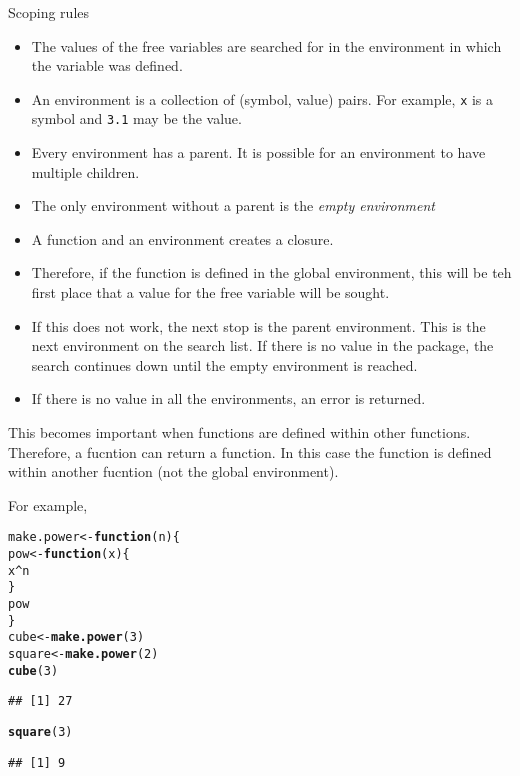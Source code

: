 \documentclass[12pt, a4paper, oneside]{article}\usepackage[]{graphicx}\usepackage[]{color}
\makeatletter
\newcommand{\hlnum}[1]{\textcolor[rgb]{0.686,0.059,0.569}{#1}}%
\newcommand{\hlopt}[1]{\textcolor[rgb]{0,0,0}{#1}}%
\newcommand{\hlstd}[1]{\textcolor[rgb]{0.345,0.345,0.345}{#1}}%
\newcommand{\hlkwa}[1]{\textcolor[rgb]{0.161,0.373,0.58}{\textbf{#1}}}%
\newcommand{\hlkwb}[1]{\textcolor[rgb]{0.69,0.353,0.396}{#1}}%
\newcommand{\hlkwc}[1]{\textcolor[rgb]{0.333,0.667,0.333}{#1}}%
\newcommand{\hlkwd}[1]{\textcolor[rgb]{0.737,0.353,0.396}{\textbf{#1}}}%
\newenvironment{kframe}{%
 \def\at@end@of@kframe{}%
 \ifinner\ifhmode%
  \def\at@end@of@kframe{\end{minipage}}%
  \begin{minipage}{\columnwidth}%
 \fi\fi%
 \def\FrameCommand##1{\hskip\@totalleftmargin \hskip-\fboxsep
 \colorbox{shadecolor}{##1}\hskip-\fboxsep
     \hskip-\linewidth \hskip-\@totalleftmargin \hskip\columnwidth}%
 \MakeFramed {\advance\hsize-\width
   \@totalleftmargin\z@ \linewidth\hsize
   \@setminipage}}%
 {\par\unskip\endMakeFramed%
 \at@end@of@kframe}
\newenvironment{knitrout}{}{} %
\makeatother
\begin{document}
Scoping rules
\begin{itemize}
\item  The values of the free variables are searched for in the environment in which the variable was defined.  
\item An environment is a collection of (symbol, value) pairs. For example, \lstinline{x} is a symbol and \lstinline{3.1} may be the value. 
\item Every environment has a parent.  It is possible for an environment to have multiple children. 
\item The only environment without a parent is the \emph{empty environment}
\item A function and an environment creates a closure. 
\item Therefore, if the function is defined in the global environment, this will be teh first place that a value for the free variable will be sought. 
\item If this does not work, the next stop is the parent environment. This is the next environment on the search list. If there is no value in the package, the search continues down until the empty environment is reached. 
\item If there is no value in all the environments, an error is returned.
\end{itemize}

This becomes important when functions are defined within other functions.  Therefore, a fucntion can return a function. In this case the function is defined within another fucntion (not the global environment).  

For example, 

\begin{knitrout}
\color{fgcolor}\begin{kframe}
\begin{alltt}
\hlstd{make.power} \hlkwb{<-} \hlkwa{function}\hlstd{(}\hlkwc{n}\hlstd{) \{}
    \hlstd{pow} \hlkwb{<-} \hlkwa{function}\hlstd{(}\hlkwc{x}\hlstd{) \{}
        \hlstd{x}\hlopt{^}\hlstd{n}
    \hlstd{\}}
    \hlstd{pow}
\hlstd{\}}
\hlstd{cube} \hlkwb{<-} \hlkwd{make.power}\hlstd{(}\hlnum{3}\hlstd{)}
\hlstd{square} \hlkwb{<-} \hlkwd{make.power}\hlstd{(}\hlnum{2}\hlstd{)}
\hlkwd{cube}\hlstd{(}\hlnum{3}\hlstd{)}
\end{alltt}
\begin{verbatim}
## [1] 27
\end{verbatim}
\begin{alltt}
\hlkwd{square}\hlstd{(}\hlnum{3}\hlstd{)}
\end{alltt}
\begin{verbatim}
## [1] 9
\end{verbatim}
\end{kframe}
\end{knitrout}
\end{document}
